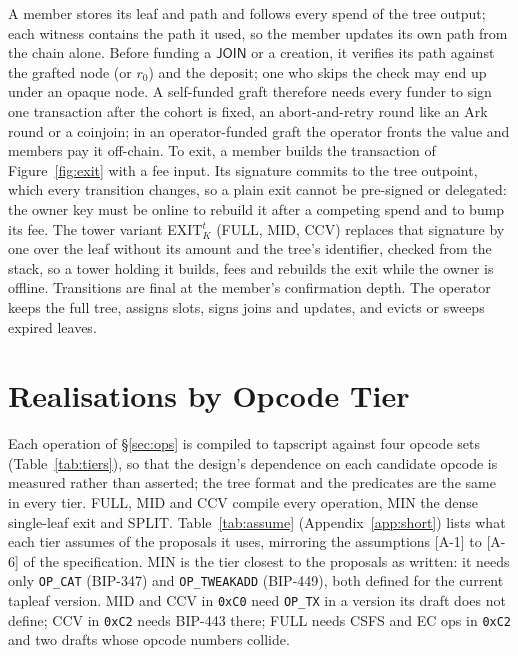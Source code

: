 \documentclass[runningheads]{llncs}
\newif\iffullversion
\newcommand{\op}[1]{\texttt{OP\_#1}}
\newcommand{\tr}[1]{\textsf{#1}}
\newcommand{\iface}[1]{\ensuremath{\mathsf{#1}}}
\begin{document}
A member stores its leaf and path and follows every spend of the tree
output; each witness contains the path it used, so the member updates its
own path from the chain alone. Before funding a \iface{JOIN} or a
creation, it verifies its path against the grafted node (or $r_0$) and
the deposit; one who skips the check may end up under an opaque node. A
self-funded graft therefore needs every funder to sign one transaction
after the cohort is fixed, an abort-and-retry round like an Ark round or
a coinjoin; in an operator-funded graft the operator fronts the value and
members pay it off-chain. To exit, a member builds the transaction of
Figure~\ref{fig:exit} with a fee input. Its signature commits to the tree
outpoint, which every transition changes, so a plain exit cannot be
pre-signed or delegated: the owner key must be online to rebuild it after
a competing spend and to bump its fee. The tower variant \tr{EXIT}$_K^{t}$
(FULL, MID, CCV) replaces that signature by one over the leaf without
its amount and the tree's identifier, checked from the stack, so a tower holding it builds,
fees and rebuilds the exit while the owner is offline. Transitions are final at the
member's confirmation depth. The operator keeps the full tree, assigns
slots, signs joins and updates, and evicts or sweeps expired leaves.

\algCreate
\algGraft
\algAccept
\algExit
\algFollow
\algVouch
\algRedeem
\algSwap
\algRewrite
\algEvict

\else



\fi

\section{Realisations by Opcode Tier}\label{sec:scripts}

Each \iffullversion predicate of Table~\ref{tab:pred}\else operation of
\S\ref{sec:ops}\fi{} is compiled to tapscript against
four opcode sets (Table~\ref{tab:tiers}), so that the design's dependence
on each candidate opcode is measured rather than asserted; the tree format
and the predicates are the same in every tier. FULL, MID and CCV compile
every \iffullversion predicate of Table~\ref{tab:pred}\else operation\fi,
MIN the dense single-leaf exit
and \tr{SPLIT}. Table~\ref{tab:assume}\iffullversion\else{}
(Appendix~\ref{app:short})\fi{} lists what each tier assumes of the
proposals it uses, mirroring the assumptions [A-1] to [A-6] of the
specification. MIN is the tier closest to the proposals as written: it
needs only \op{CAT} (BIP-347) and \op{TWEAKADD} (BIP-449), both defined
for the current tapleaf version. MID and CCV in \texttt{0xC0} need \op{TX} in a
version its draft does not define; CCV in \texttt{0xC2} needs BIP-443
there; FULL needs CSFS and EC ops in \texttt{0xC2} and two drafts
whose opcode numbers collide.
\end{document}

